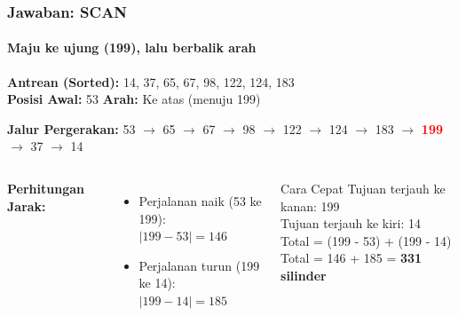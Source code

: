 \documentclass[t,aspectratio=169,xcolor=dvipsnames]{beamer}
\newcommand{\tem}[1]{\textbf{\textcolor{red}{#1}}}
\begin{document}
\begin{frame}
    \frametitle{Jawaban: SCAN}
    \framesubtitle{Maju ke ujung (199), lalu berbalik arah}
    \small
    \textbf{Antrean (Sorted):} 14, 37, 65, 67, 98, 122, 124, 183\\
    \textbf{Posisi Awal:} 53 \quad \textbf{Arah:} Ke atas (menuju 199)
    
    \vspace{0.3cm}
    \textbf{Jalur Pergerakan:}
    53 $\rightarrow$ 65 $\rightarrow$ 67 $\rightarrow$ 98 $\rightarrow$ 122 $\rightarrow$ 124 $\rightarrow$ 183 $\rightarrow$ \tem{199} $\rightarrow$ 37 $\rightarrow$ 14
    
    \vspace{0.3cm}
    \begin{columns}[T]
        \textbf{Perhitungan Jarak:}
        \begin{itemize}
            \item Perjalanan naik (53 ke 199):\\
                  $|199 - 53| = 146$
            \item Perjalanan turun (199 ke 14):\\
                  $|199 - 14| = 185$
        \end{itemize}
        
        \begin{exampleblock}{Cara Cepat}
            Tujuan terjauh ke kanan: 199\\
            Tujuan terjauh ke kiri: 14\\
            Total = (199 - 53) + (199 - 14)\\
            Total = 146 + 185 = \textbf{331 silinder}
        \end{exampleblock}
    \end{columns}
\end{frame}
\end{document}
